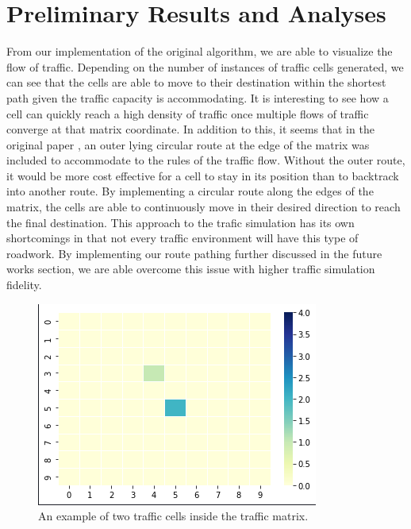 \documentclass[sigplan,screen]{acmart}
\begin{document}
\section{Preliminary Results and Analyses}
From our implementation of the original algorithm, we are able to visualize the
flow of traffic. Depending on the number of instances of traffic cells
generated, we can see that the cells are able to move to their destination
within the shortest path given the traffic capacity is accommodating. It is
interesting to see how a cell can quickly reach a high density of traffic once
multiple flows of traffic converge at that matrix coordinate. In addition to
this, it seems that in the original paper \cite{pang_simulation_2019}, an outer
lying circular route at the edge of the matrix was included to accommodate to
the rules of the traffic flow. Without the outer route, it would be more cost
effective for a cell to stay in its position than to backtrack into another
route. By implementing a circular route along the edges of the matrix, the cells
are able to continuously move in their desired direction to reach the final
destination. This approach to the trafic simulation has its own shortcomings in
that not every traffic environment will have this type of roadwork. By
implementing our route pathing further discussed in the future works section, we
are able overcome this issue with higher traffic simulation fidelity.

\begin{figure}[h]
    \centering
    \includegraphics[width=\columnwidth]{assets/cells.png}
    \caption{An example of two traffic cells inside the traffic matrix.}
    \label{fig:cells}
\end{figure}
\end{document}
